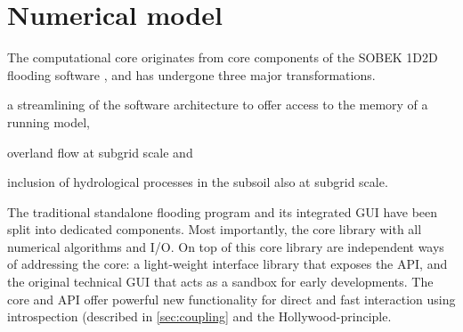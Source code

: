 \documentclass[a4paper]{article}
\begin{document}

\section{Numerical model}
The computational core originates from core components of the {SOBEK} 1D2D flooding software \citep{Stelling2006}, and has undergone three major transformations. \begin{inparaenum}
\item a streamlining of the software architecture to offer access to the memory of a running model,
\item overland flow at subgrid scale and
\item inclusion of hydrological processes in the subsoil also at subgrid scale.
\end{inparaenum}

The traditional standalone flooding program and its integrated \ac{GUI} have been split into dedicated components. Most importantly, the core library with all numerical algorithms and I/O. On top of this core library are independent ways of addressing the core: a light-weight interface library that exposes the \ac{API}, and the original technical \ac{GUI} that acts as a sandbox for early developments.
The core and \ac{API} offer powerful new functionality for direct and fast interaction using introspection (described in \autoref{sec:coupling} and the Hollywood-principle.
\end{document}
